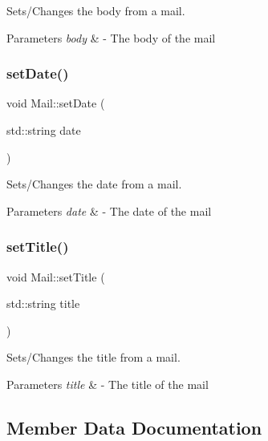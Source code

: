 Sets/\+Changes the body from a mail. 


\begin{DoxyParams}{Parameters}
{\em body} & -\/ The body of the mail \\
\hline
\end{DoxyParams}
\mbox{\label{classMail_ac5c8d190278b895b2de786be431b0a30}} 
\subsubsection{\texorpdfstring{set\+Date()}{setDate()}}
{\footnotesize\ttfamily void Mail\+::set\+Date (\begin{DoxyParamCaption}\item[{std\+::string}]{date }\end{DoxyParamCaption})}



Sets/\+Changes the date from a mail. 


\begin{DoxyParams}{Parameters}
{\em date} & -\/ The date of the mail \\
\hline
\end{DoxyParams}
\mbox{\label{classMail_aa57f6b5a2f81ded349476984c361275b}} 
\subsubsection{\texorpdfstring{set\+Title()}{setTitle()}}
{\footnotesize\ttfamily void Mail\+::set\+Title (\begin{DoxyParamCaption}\item[{std\+::string}]{title }\end{DoxyParamCaption})}



Sets/\+Changes the title from a mail. 


\begin{DoxyParams}{Parameters}
{\em title} & -\/ The title of the mail \\
\hline
\end{DoxyParams}


\subsection{Member Data Documentation}
\mbox{\label{classMail_acfe110a866f8cc54120d4f4ab0f8321b}} 
